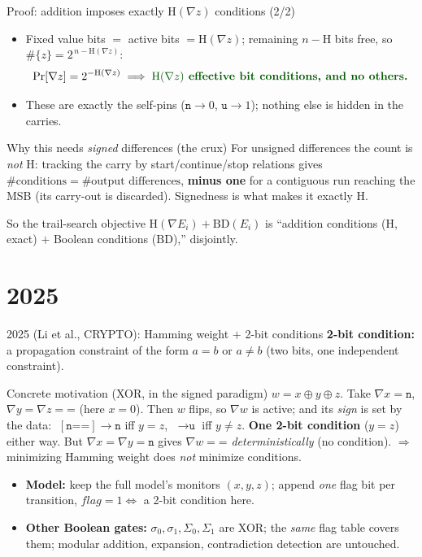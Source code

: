 \documentclass[aspectratio=169,9pt]{beamer}
\newcommand{\nn}{\texttt{n}}
\newcommand{\uu}{\texttt{u}}
\newcommand{\eq}{\texttt{=}}
\newcommand{\hwt}{\mathrm{H}}
\newcommand{\bd}{\mathrm{BD}}
\newcommand{\xor}{\oplus}
\newcommand{\key}[1]{\textcolor{key}{\textbf{#1}}}
\begin{document}
\begin{frame}{Proof: addition imposes exactly $\hwt(\nabla z)$ conditions (2/2)}
\small
\begin{itemize}
  \item Fixed value bits $=$ active bits $=\hwt(\nabla z)$; remaining $n-\hwt$ bits free, so $\#\{z\}=2^{\,n-\hwt(\nabla z)}$:
  \[
  \Pr[\nabla z]=2^{-\hwt(\nabla z)} \;\Longrightarrow\; \key{$\hwt(\nabla z)$ effective bit conditions, and no others.}
  \]
  \item These are exactly the self-pins ($\nn\!\to\!0$, $\uu\!\to\!1$); nothing else is hidden in the carries.
\end{itemize}
\begin{alertblock}{Why this needs \emph{signed} differences (the crux)}
\small For unsigned differences the count is \emph{not} $\hwt$: tracking the carry by start/continue/stop relations gives $\#\text{conditions}=\#\text{output differences}$, \key{minus one} for a contiguous run reaching the MSB (its carry-out is discarded). Signedness is what makes it exactly $\hwt$.
\end{alertblock}
\centering So the trail-search objective $\hwt(\nabla E_i)+\bd(E_i)$ is ``addition conditions ($\hwt$, exact) $+$ Boolean conditions ($\bd$),'' disjointly.
\end{frame}

\section{2025}

\begin{frame}{2025 (Li et al., CRYPTO): Hamming weight $+$ 2-bit conditions}
\textbf{2-bit condition:} a propagation constraint of the form $a=b$ or $a\neq b$ (two bits, one independent constraint).
\begin{alertblock}{Concrete motivation (XOR, in the signed paradigm)}
 $w=x\xor y\xor z$. Take $\nabla x=\nn$, $\nabla y=\nabla z=\eq$ (here $x{=}0$). Then $w$ flips, so $\nabla w$ is active; and its \emph{sign} is set by the data: $\;[\nn\eq\eq]\to\nn$ iff $y=z$, $\;\to\uu$ iff $y\neq z$. \key{One 2-bit condition} ($y\!=\!z$) either way. But $\nabla x=\nabla y=\nn$ gives $\nabla w=\eq$ \emph{deterministically} (no condition). $\Rightarrow$ minimizing Hamming weight does \emph{not} minimize conditions.
\end{alertblock}
\begin{itemize}
  \item \textbf{Model:} keep the full model's monitors $(x,y,z)$; append \emph{one} flag bit per transition, $\mathit{flag}=1\Leftrightarrow$ a 2-bit condition here.
  \item \textbf{Other Boolean gates:} $\sigma_0,\sigma_1,\Sigma_0,\Sigma_1$ are XOR; the \emph{same} flag table covers them; modular addition, expansion, contradiction detection are untouched.
\end{itemize}
\end{frame}
\end{document}
